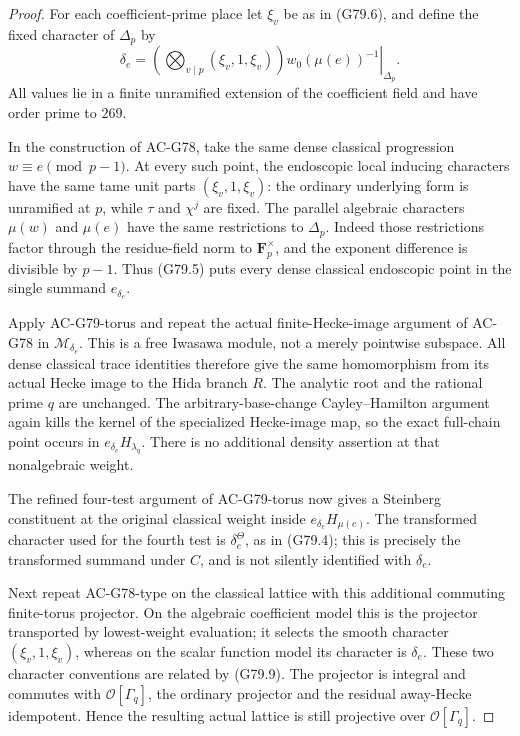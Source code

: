 \begin{proof}
For each coefficient-prime place let \(\xi_v\) be as in
(G79.6), and define the fixed character of \(\Delta_p\)
by
\[
 \delta_e=
   \left.
    \left(\bigotimes_{v\mid p}(\xi_v,1,\xi_v)\right)
                    w_0(\mu(e))^{-1}
   \right|_{\Delta_p}.                                \tag{G79.11}
\]
All values lie in a finite unramified extension of the
coefficient field and have order prime to \(269\).

In the construction of AC-G78, take the same dense
classical progression \(w\equiv e\pmod{p-1}\).
At every such point, the endoscopic local inducing
characters have the same tame unit parts
\((\xi_v,1,\xi_v)\): the ordinary underlying form is
unramified at \(p\), while \(\tau\) and \(\chi^j\) are
fixed.
The parallel algebraic characters
\(\mu(w)\) and \(\mu(e)\) have the same restrictions
to \(\Delta_p\).  Indeed those restrictions factor
through the residue-field norm to \(\mathbf F_p^\times\),
and the exponent difference is divisible by \(p-1\).
Thus (G79.5) puts every dense classical endoscopic
point in the single summand \(e_{\delta_e}\).

Apply AC-G79-torus and repeat the actual finite-Hecke-image
argument of AC-G78 in \(\mathscr M_{\delta_e}\).
This is a free Iwasawa module, not a merely pointwise
subspace.  All dense classical trace identities therefore
give the same homomorphism from its actual Hecke image
to the Hida branch \(R\).
The analytic root and the rational prime \(q\) are
unchanged.  The arbitrary-base-change Cayley--Hamilton
argument again kills the kernel of the specialized
Hecke-image map, so the exact full-chain point occurs
in \(e_{\delta_e}H_{\lambda_q}\).
There is no additional density assertion at that
nonalgebraic weight.

The refined four-test argument of AC-G79-torus now gives
a Steinberg constituent at the original classical weight
inside \(e_{\delta_e}H_{\mu(e)}\).
The transformed character used for the fourth test is
\(\delta_e^\Theta\), as in (G79.4); this is precisely the
transformed summand under \(C\), and is not silently
identified with \(\delta_e\).

Next repeat AC-G78-type on the classical lattice with
this additional commuting finite-torus projector.
On the algebraic coefficient model this is the projector
transported by lowest-weight evaluation; it selects
the smooth character \((\xi_v,1,\xi_v)\), whereas on the
scalar function model its character is \(\delta_e\).
These two character conventions are related by (G79.9).
The projector is integral and commutes with
\(\mathcal O[\Gamma_q]\), the ordinary projector and
the residual away-Hecke idempotent.
Hence the resulting actual lattice is still projective
over \(\mathcal O[\Gamma_q]\).


\end{proof}

